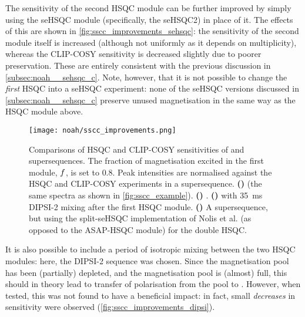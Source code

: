 The sensitivity of the second HSQC module can be further improved by simply using the seHSQC module (specifically, the seHSQC2) in place of it.
The effects of this are shown in \cref{fig:sscc_improvements_sehsqc}: the sensitivity of the second module itself is increased (although not uniformly as it depends on multiplicity), whereas the CLIP-COSY sensitivity is decreased slightly due to poorer  preservation.
These are entirely consistent with the previous discussion in \cref{subsec:noah__sehsqc_c}.
Note, however, that it is not possible to change the \textit{first} HSQC into a seHSQC experiment: none of the seHSQC versions discussed in \cref{subsec:noah__sehsqc_c} preserve unused  magnetisation in the same way as the HSQC module above.

\begin{figure}[!ht]
    \centering
    \texttt{[image: noah/sscc\_improvements.png]}%
    {\label{fig:sscc_improvements_base}}%
    {\label{fig:sscc_improvements_sehsqc}}%
    {\label{fig:sscc_improvements_dipsi}}%
    {\label{fig:sscc_improvements_split_sehsqc}}%
    \caption[Sensitivity comparisons for  and  supersequences]{
        Comparisons of HSQC and CLIP-COSY sensitivities of  and  supersequences.
        The fraction of  magnetisation excited in the first module, $f\/$, is set to $0.8$.
        Peak intensities are normalised against the HSQC and CLIP-COSY experiments in a  supersequence.
        \textbf{()}  (the same spectra as shown in \cref{fig:sscc_example}).
        \textbf{()} .
        \textbf{()}  with \qty{35}{\ms} DIPSI-2 mixing after the first HSQC module.
        \textbf{()} A  supersequence, but using the split-seHSQC implementation of Nolis et al.\autocite{Nolis2019CPC} (as opposed to the ASAP-HSQC module) for the double HSQC.
    }
    \label{fig:sscc_improvements}
\end{figure}

It is also possible to include a period of isotropic mixing between the two HSQC modules: here, the DIPSI-2 sequence\autocite{Shaka1988JMR} was chosen.
Since the  magnetisation pool has been (partially) depleted, and the  magnetisation pool is (almost) full, this should in theory lead to transfer of polarisation from the  pool to .
However, when tested, this was not found to have a beneficial impact: in fact, small \textit{decreases} in sensitivity were observed (\cref{fig:sscc_improvements_dipsi}).

